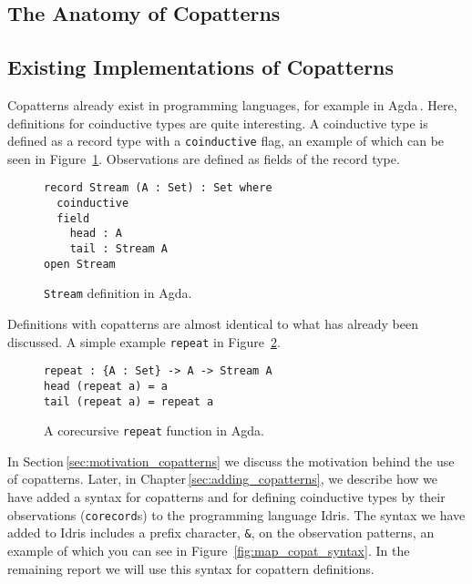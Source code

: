 \subsection{The Anatomy of Copatterns}

\subsection{Existing Implementations of Copatterns}
Copatterns already exist in programming languages, for example in
Agda\,\cite{Norell:thesis}. Here, definitions for coinductive types are quite
interesting. A coinductive type is defined as a record type with a
\texttt{coinductive} flag, an example of which can be seen in
Figure~\ref{fig:agda_stream}. Observations are defined as fields of the record
type.

\begin{figure}[h]
\begin{lstlisting}[mathescape]
record Stream (A : Set) : Set where
  coinductive
  field
    head : A
    tail : Stream A
open Stream
\end{lstlisting}
\caption{\texttt{Stream} definition in Agda.}
\label{fig:agda_stream}
\end{figure}

Definitions with copatterns are almost identical to what has already been
discussed. A simple example \texttt{repeat} in Figure~\ref{fig:agda_repeat}. 

\begin{figure}[h]
\begin{lstlisting}[mathescape]
repeat : {A : Set} -> A -> Stream A
head (repeat a) = a
tail (repeat a) = repeat a 
\end{lstlisting}
\caption{A corecursive \texttt{repeat} function in Agda.}
\label{fig:agda_repeat}
\end{figure}

In Section\,\ref{sec:motivation_copatterns} we discuss the motivation behind the
use of copatterns. Later, in Chapter\,\ref{sec:adding_copatterns}, we describe
how we have added a syntax for copatterns and for defining coinductive types by
their observations (\texttt{corecord}s) to the programming language Idris. The
syntax we have added to Idris includes a prefix character, \texttt{\&}, on the
observation patterns, an example of which you can see in
Figure~\ref{fig:map_copat_syntax}. In the remaining report we will use this
syntax for copattern definitions.

